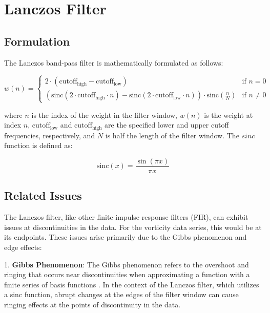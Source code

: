 \chapter{Lanczos Filter}\label{ap01}

\section{Formulation}

The Lanczos band-pass filter is mathematically formulated as follows:

\begin{equation}
w(n) = 
\begin{cases} 
2 \cdot (\text{cutoff}_\text{high} - \text{cutoff}_\text{low}) & \text{if } n = 0 \\
\left( \text{sinc}(2 \cdot \text{cutoff}_\text{high} \cdot n) - \text{sinc}(2 \cdot \text{cutoff}_\text{low} \cdot n) \right) \cdot \text{sinc}\left(\frac{n}{N}\right) & \text{if } n \neq 0 
\end{cases}
\end{equation}

where $n$ is the index of the weight in the filter window, $w(n)$ is the weight at index $n$, $\text{cutoff}_\text{low}$ and $\text{cutoff}_\text{high}$ are the specified lower and upper cutoff frequencies, respectively, and $N$ is half the length of the filter window. The $sinc$ function is defined as:

\begin{equation}
\text{sinc}(x) = \frac{\sin(\pi x)}{\pi x}
\end{equation}

\section{Related Issues}

The Lanczos filter, like other finite impulse response filters (FIR), can exhibit issues at discontinuities in the data. For the vorticity data series, this would be at its endpoints. These issues arise primarily due to the Gibbs phenomenon and edge effects:

1. \textbf{Gibbs Phenomenon}: The Gibbs phenomenon refers to the overshoot and ringing that occurs near discontinuities when approximating a function with a finite series of basis functions \citep{gibbs1898, hamming1989}. In the context of the Lanczos filter, which utilizes a sinc function, abrupt changes at the edges of the filter window can cause ringing effects at the points of discontinuity in the data.

